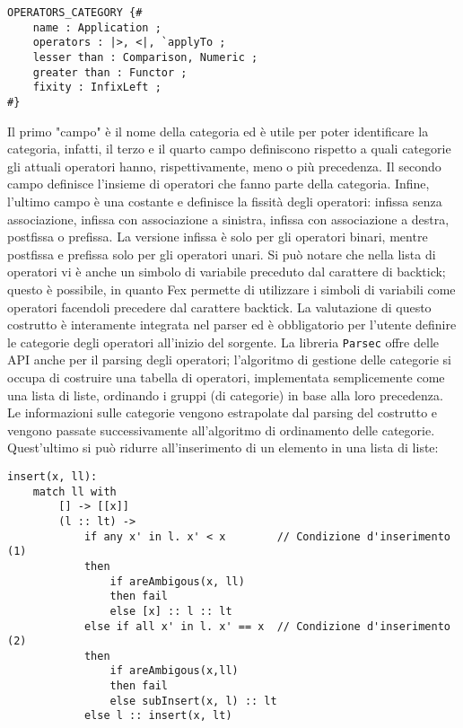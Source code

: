 \documentclass[10pt,a4paper]{article}
\begin{document}
\begin{lstlisting}
OPERATORS_CATEGORY {#
    name : Application ;
    operators : |>, <|, `applyTo ;
    lesser than : Comparison, Numeric ;
    greater than : Functor ;
    fixity : InfixLeft ;
#}
\end{lstlisting}

Il primo "campo" è il nome della categoria ed è utile per poter identificare la categoria, infatti, il terzo e il
quarto campo definiscono rispetto a quali categorie gli attuali operatori hanno, rispettivamente, meno o più precedenza.
Il secondo campo definisce
l'insieme di operatori che fanno parte della categoria. Infine, l'ultimo campo è una costante e definisce la fissità
degli operatori: infissa senza associazione, infissa con associazione a sinistra, infissa con associazione a destra,
postfissa o prefissa. La versione infissa è solo per gli operatori binari, mentre postfissa e prefissa solo per gli
operatori unari. Si può notare che nella lista di operatori vi è anche un simbolo di variabile preceduto dal carattere
di backtick; questo è possibile, in quanto Fex permette di utilizzare i simboli di variabili come operatori
facendoli precedere dal carattere backtick. La valutazione di questo costrutto è interamente integrata nel parser ed
è obbligatorio per l'utente definire le categorie degli operatori all'inizio del sorgente. La libreria \texttt{Parsec}
offre delle API anche per il parsing degli operatori; l'algoritmo di gestione delle categorie si occupa di costruire
una tabella di operatori, implementata semplicemente come una lista di liste, ordinando i gruppi (di categorie) in
base alla loro precedenza. Le informazioni sulle categorie vengono estrapolate dal parsing del costrutto e vengono
passate successivamente all'algoritmo di ordinamento delle categorie. Quest'ultimo si può ridurre all'inserimento
di un elemento in una lista di liste:

\begin{lstlisting}
insert(x, ll):
    match ll with
        [] -> [[x]]
        (l :: lt) ->
            if any x' in l. x' < x        // Condizione d'inserimento (1)
            then
                if areAmbigous(x, ll)
                then fail
                else [x] :: l :: lt
            else if all x' in l. x' == x  // Condizione d'inserimento (2)
            then
                if areAmbigous(x,ll)
                then fail
                else subInsert(x, l) :: lt
            else l :: insert(x, lt)
\end{lstlisting}
\end{document}
